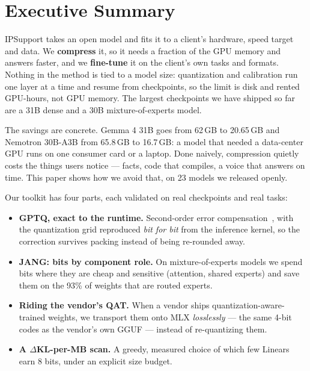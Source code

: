 \documentclass[10pt,letterpaper]{article}
\begin{document}
\tableofcontents
\clearpage

\section{Executive Summary}

IPSupport takes an open model and fits it to a client's hardware, speed target and data. We \textbf{compress} it, so it needs a fraction of the GPU memory and answers faster, and we \textbf{fine-tune} it on the client's own tasks and formats. Nothing in the method is tied to a model size: quantization and calibration run one layer at a time and resume from checkpoints, so the limit is disk and rented GPU-hours, not GPU memory. The largest checkpoints we have shipped so far are a 31B dense and a 30B mixture-of-experts model.

The savings are concrete. Gemma 4 31B goes from 62\,GB to 20.65\,GB and Nemotron 30B-A3B from 65.8\,GB to 16.7\,GB: a model that needed a data-center GPU runs on one consumer card or a laptop. Done naively, compression quietly costs the things users notice --- facts, code that compiles, a voice that answers on time. This paper shows how we avoid that, on 23 models we released openly.

Our toolkit has four parts, each validated on real checkpoints and real tasks:
\begin{itemize}
  \item \textbf{GPTQ, exact to the runtime.} Second-order error compensation~\cite{gptq}, with the quantization grid reproduced \emph{bit for bit} from the inference kernel, so the correction survives packing instead of being re-rounded away.
  \item \textbf{JANG: bits by component role.} On mixture-of-experts models we spend bits where they are cheap and sensitive (attention, shared experts) and save them on the 93\% of weights that are routed experts.
  \item \textbf{Riding the vendor's QAT.} When a vendor ships quantization-aware-trained weights, we transport them onto MLX \emph{losslessly} --- the same 4-bit codes as the vendor's own GGUF --- instead of re-quantizing them.
  \item \textbf{A $\Delta$KL-per-MB scan.} A greedy, measured choice of which few Linears earn 8 bits, under an explicit size budget.
\end{itemize}
\end{document}
